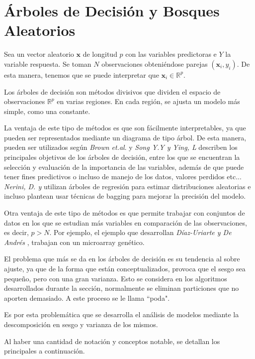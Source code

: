 \newpage
\section{ Árboles de Decisión y Bosques Aleatorios}
\noindent Sea un vector aleatorio $\textbf{x}$ de longitud $p$ con las variables predictoras e $Y$ la variable respuesta. Se toman $N$ observaciones obteniéndose parejas $(\textbf{x}_i,y_i)$. De esta manera, tenemos que se puede interpretar que $\mathbf{x}_i\in\mathbb{R}^p$.

\noindent Los árboles de decisión son métodos divisivos que dividen el espacio de observaciones $\mathbb{R}^p$ en varias regiones. En cada región, se ajusta un modelo más simple, como una constante.

\noindent La ventaja de este tipo de métodos es que son fácilmente interpretables, ya que pueden ser representados mediante un diagrama de tipo árbol. De esta manera, pueden ser utilizados según \textit{Brown et.al}.\cite{Brown 2004} y \emph{Song Y.Y y Ying, L} \cite{Song 2015} describen los principales objetivos de los árboles de decisión, entre los que se encuentran la selección y evaluación de la importancia de las variables, además de que puede tener fines predictivos o incluso de manejo de los datos, valores perdidos etc... \emph{Nerini, D. y }\cite{Nerini 2007} utilizan árboles de regresión para estimar distribuciones aleatorias e incluso plantean usar técnicas de bagging para mejorar la precisión del modelo. 

\noindent Otra ventaja de este tipo de métodos es que permite trabajar con conjuntos de datos en los que se estudian más variables en comparación de las observaciones, es decir, $p > N$. Por ejemplo, el ejemplo que desarrollan \textit{Díaz-Uriarte y De Andrés} \cite{Diaz 2006}, trabajan con un microarray genético. 

\noindent El problema que más se da en los árboles de decisión es su tendencia al sobre ajuste, ya que de la forma que están conceptualizados, provoca que el sesgo sea pequeño, pero con una gran varianza. Esto se considera en los algoritmos desarrollados durante la sección, normalmente se eliminan particiones que no aporten demasiado. A este proceso se le llama ``poda". 

\noindent Es por esta problemática que se desarrolla el análisis de modelos mediante la descomposición en sesgo y varianza de los mismos. 

\noindent Al haber una cantidad de notación y conceptos notable, se detallan los principales a continuación. 

